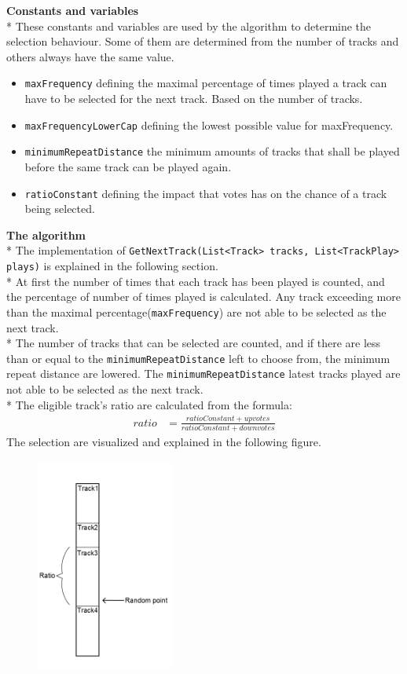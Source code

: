 \documentclass[a4paper,11pt,report]{article}
\begin{document}
{\textbf{Constants and variables} \\*
These constants and variables are used by the algorithm to determine the selection behaviour. Some of them are determined from the number of tracks and others always have the same value.
\begin{itemize}
\item \texttt{maxFrequency} defining the maximal percentage of times played a track can have to be selected for the next track. Based on the number of tracks.
\item \texttt{maxFrequencyLowerCap} defining the lowest possible value for maxFrequency.
\item \texttt{minimumRepeatDistance} the minimum amounts of tracks that shall be played before the same track can be played again.
\item \texttt{ratioConstant} defining the impact that votes has on the chance of a track being selected.
\end{itemize}
\textbf{The algorithm} \\*
The implementation of \texttt{GetNextTrack(List<Track> tracks, List<TrackPlay> plays)} is explained in the following section. \\*
At first the number of times that each track has been played is counted, and the percentage of number of times played is calculated. Any track exceeding more than the maximal percentage(\texttt{maxFrequency}) are not able to be selected as the next track. \\*
The number of tracks that can be selected are counted, and if there are less than or equal to the \texttt{minimumRepeatDistance} left to choose from, the minimum repeat distance are lowered. The \texttt{minimumRepeatDistance} latest tracks played are not able to be selected as the next track.  \\*
The eligible track's ratio are calculated from the formula:
\begin{align*}
ratio &= \frac{ratioConstant + upvotes}{ratioConstant + downvotes}
\end{align*}
The selection are visualized and explained in the following figure.\\
\begin{figure}[htp]
\centering
\includegraphics[width=130pt,height=200pt,keepaspectratio=true]{./trackSelectionB.png}

\end{figure}}
\end{document}
